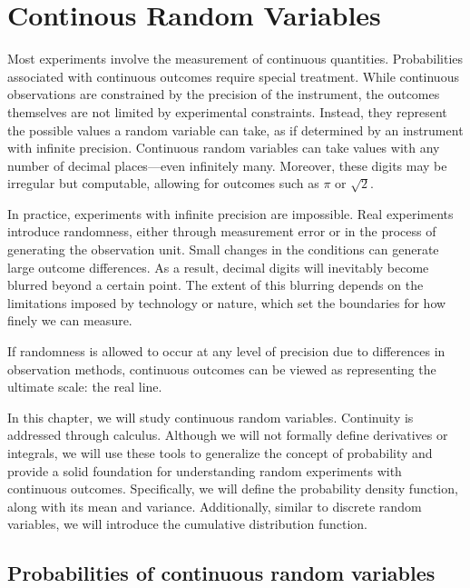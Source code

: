 \documentclass[
]{book}
\begin{document}
\hypertarget{continous-random-variables}{%
\chapter{Continous Random Variables}\label{continous-random-variables}}

Most experiments involve the measurement of continuous quantities. Probabilities associated with continuous outcomes require special treatment. While continuous observations are constrained by the precision of the instrument, the outcomes themselves are not limited by experimental constraints. Instead, they represent the possible values a random variable can take, as if determined by an instrument with infinite precision. Continuous random variables can take values with any number of decimal places---even infinitely many. Moreover, these digits may be irregular but computable, allowing for outcomes such as
\(\pi\) or \(\sqrt{2}\).

In practice, experiments with infinite precision are impossible. Real experiments introduce randomness, either through measurement error or in the process of generating the observation unit. Small changes in the conditions can generate large outcome differences. As a result, decimal digits will inevitably become blurred beyond a certain point. The extent of this blurring depends on the limitations imposed by technology or nature, which set the boundaries for how finely we can measure.

If randomness is allowed to occur at any level of precision due to differences in observation methods, continuous outcomes can be viewed as representing the ultimate scale: the real line.

In this chapter, we will study continuous random variables. Continuity is addressed through calculus. Although we will not formally define derivatives or integrals, we will use these tools to generalize the concept of probability and provide a solid foundation for understanding random experiments with continuous outcomes. Specifically, we will define the probability density function, along with its mean and variance. Additionally, similar to discrete random variables, we will introduce the cumulative distribution function.

\hypertarget{probabilities-of-continuous-random-variables}{%
\section{Probabilities of continuous random variables}\label{probabilities-of-continuous-random-variables}}
\end{document}
